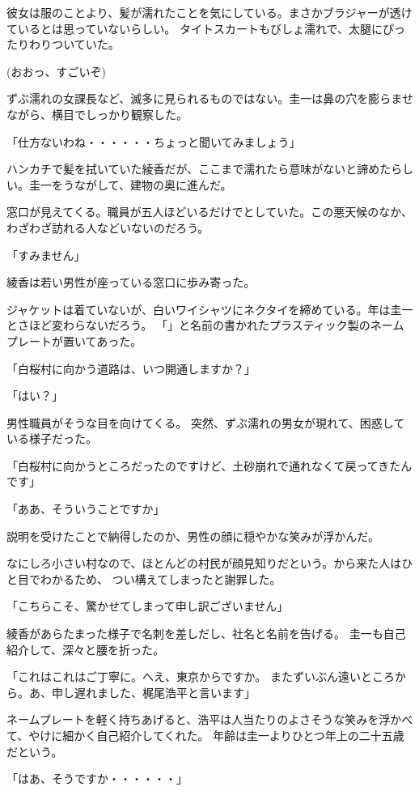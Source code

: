 ﻿\documentclass[book,tate]{jlreq}
\begin{document}
彼女は服のことより、髪が濡れたことを気にしている。まさかブラジャーが透けているとは思っていないらしい。
タイトスカートもびしょ濡れで、太腿にぴったりわりついていた。

(おおっ、すごいぞ)

ずぶ濡れの女課長など、滅多に見られるものではない。圭一は鼻の穴を膨らませながら、横目でしっかり観察した。

「仕方ないわね・・・・・・ちょっと聞いてみましょう」

ハンカチで髪を拭いていた綾香だが、ここまで濡れたら意味がないと諦めたらしい。圭一をうながして、建物の奥に進んだ。

窓口が見えてくる。職員が五人ほどいるだけでとしていた。この悪天候のなか、
わざわざ訪れる人などいないのだろう。

「すみません」

綾香は若い男性が座っている窓口に歩み寄った。

ジャケットは着ていないが、白いワイシャツにネクタイを締めている。年は圭一とさほど変わらないだろう。
「」と名前の書かれたプラスティック製のネームプレートが置いてあった。

「白桜村に向かう道路は、いつ開通しますか？」

「はい？」

男性職員がそうな目を向けてくる。 突然、ずぶ濡れの男女が現れて、困惑している様子だった。

「白桜村に向かうところだったのですけど、土砂崩れで通れなくて戻ってきたんです」

「ああ、そういうことですか」

説明を受けたことで納得したのか、男性の顔に穏やかな笑みが浮かんだ。

なにしろ小さい村なので、ほとんどの村民が顔見知りだという。から来た人はひと目でわかるため、
つい構えてしまったと謝罪した。

「こちらこそ、驚かせてしまって申し訳ございません」

綾香があらたまった様子で名刺を差しだし、社名と名前を告げる。 圭一も自己紹介して、深々と腰を折った。

「これはこれはご丁寧に。へえ、東京からですか。 またずいぶん遠いところから。あ、申し遅れました、梶尾浩平と言います」

ネームプレートを軽く持ちあげると、浩平は人当たりのよさそうな笑みを浮かべて、やけに細かく自己紹介してくれた。 年齢は圭一よりひとつ年上の二十五歳だという。

「はあ、そうですか・・・・・・」
\end{document}

